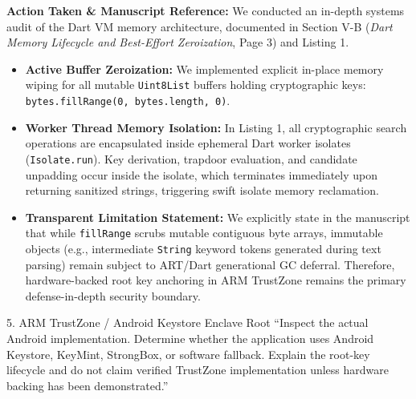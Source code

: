 \documentclass[11pt,a4paper]{article}
\begin{document}
\begin{responsebox}
\textbf{Action Taken \& Manuscript Reference:} We conducted an in-depth systems audit of the Dart VM memory architecture, documented in Section V-B (\emph{Dart Memory Lifecycle and Best-Effort Zeroization}, Page 3) and Listing 1.

\begin{itemize}[itemsep=2pt]
    \item \textbf{Active Buffer Zeroization:} We implemented explicit in-place memory wiping for all mutable \texttt{Uint8List} buffers holding cryptographic keys: \texttt{bytes.fillRange(0, bytes.length, 0)}.
    \item \textbf{Worker Thread Memory Isolation:} In Listing 1, all cryptographic search operations are encapsulated inside ephemeral Dart worker isolates (\texttt{Isolate.run}). Key derivation, trapdoor evaluation, and candidate unpadding occur inside the isolate, which terminates immediately upon returning sanitized strings, triggering swift isolate memory reclamation.
    \item \textbf{Transparent Limitation Statement:} We explicitly state in the manuscript that while \texttt{fillRange} scrubs mutable contiguous byte arrays, immutable objects (e.g., intermediate \texttt{String} keyword tokens generated during text parsing) remain subject to ART/Dart generational GC deferral. Therefore, hardware-backed root key anchoring in ARM TrustZone remains the primary defense-in-depth security boundary.
\end{itemize}
\end{responsebox}

\vspace{1em}

\begin{reviewbox}{5. ARM TrustZone / Android Keystore Enclave Root}
``Inspect the actual Android implementation. Determine whether the application uses Android Keystore, KeyMint, StrongBox, or software fallback. Explain the root-key lifecycle and do not claim verified TrustZone implementation unless hardware backing has been demonstrated.''
\end{reviewbox}
\end{document}
